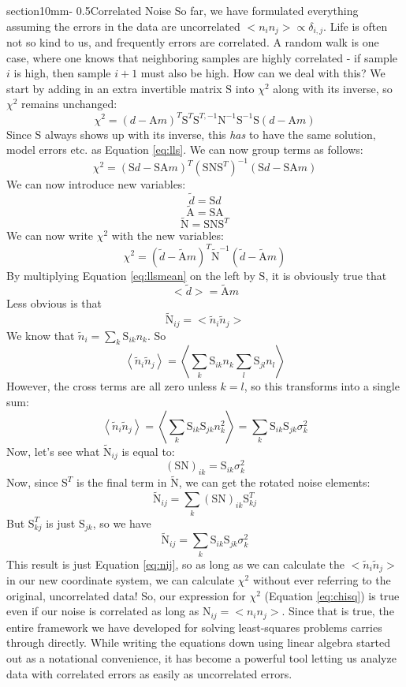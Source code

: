 \documentclass[letterpaper,11pt,preprint]{aastex}
\makeatletter
\renewcommand{\section}{\@startsection%
{section}{1}{0mm}{-\baselineskip}%
{0.5\baselineskip}{\normalfont\Large\bfseries}}%
\makeatother
\begin{document}
{\section{Correlated Noise}
So far, we have formulated everything assuming the errors in the data
are uncorrelated $<n_i n_j> \propto \delta_{i,j}$.  Life is often not
so kind to us, and frequently errors are correlated.  A random walk is
one case, where one knows that neighboring samples are highly correlated
- if sample $i$ is high, then sample $i+1$ must also be high.  How can
we deal with this?  We start by adding in an extra invertible matrix $\mathrm{S}$ into
$\chi^2$ along with its inverse, so $\chi^2$ remains unchanged:
$$\chi^2 = (d-\mathrm{A}m)^T \mathrm{S}^T \mathrm{S}^{T,-1}
\mathrm{N}^{-1} \mathrm{S}^{-1} \mathrm{S} (d-\mathrm{A}m)$$
Since $\mathrm{S}$ always shows up with its inverse, this
{\textit{has}} to have the same solution, model errors etc. as Equation \ref{eq:lls}.  We
can now group terms as follows:
$$\chi^2 = \left (\mathrm{S}d-\mathrm{SA}m \right)^T \left
(\mathrm{SNS}^T \right )^{-1}  \left (\mathrm{S}d-\mathrm{SA}m \right)$$
We can now introduce new variables:
$$\tilde{d}=\mathrm{S}d$$
$$\tilde{\mathrm{A}}=\mathrm{SA}$$
$$\tilde{\mathrm{N}}=\mathrm{SNS}^T$$
We can now write $\chi^2$ with the new variables:
$$\chi^2=\left (\tilde{d}-\tilde{\mathrm{A}}m \right )^T
\tilde{\mathrm{N}}^{-1} \left (\tilde{d}-\tilde{\mathrm{A}}m \right )$$
By multiplying Equation \ref{eq:llsmean} on the left by $\mathrm{S}$,
it is obviously true that 
$$<\tilde{d}> = \tilde{\mathrm{A}}m$$
Less obvious is that
$$\tilde{\mathrm{N}}_{ij}=<\tilde{n}_i \tilde{n}_j>$$
We know that $\tilde{n}_i = \sum_k \mathrm{S}_{ik}n_k$. So
$$\left <\tilde{n}_i\tilde{n}_j \right > =  \left < \sum_k \mathrm{S}_{ik}n_k
\sum_l \mathrm{S}_{jl}n_l\right >$$
However, the cross terms are all zero unless $k=l$, so this transforms
into a single sum:
\begin{equation} \label{eq:nij}
\left <\tilde{n}_i\tilde{n}_j \right > = \left < \sum_k
\mathrm{S}_{ik}\mathrm{S}_{jk}n_k^2 \right > = \sum_k \mathrm{S}_{ik}
\mathrm{S}_{jk} \sigma_k^2\end{equation}
Now, let's see what $\tilde{\mathrm{N}}_{ij}$ is equal to:
$$(\mathrm{SN})_{ik} = \mathrm{S}_{ik} \sigma_k^2$$
Now, since $\mathrm{S}^T$ is the final term in
$\tilde{\mathrm{N}}$, we can get the rotated noise elements:
$$\tilde{\mathrm{N}}_{ij}=\sum_k(\mathrm{SN})_{ik} \mathrm{S}^T_{kj}$$
But $\mathrm{S}^T_{kj}$ is just $\mathrm{S}_{jk}$, so we have
$$\tilde{\mathrm{N}}_{ij}=\sum_k  \mathrm{S}_{ik}\mathrm{S}_{jk} \sigma_k^2$$
This result is just Equation \ref{eq:nij}, so as long as we can
calculate the $<\tilde{n}_i\tilde{n}_j>$ in our new coordinate system,
we can calculate $\chi^2$ without ever referring to the original,
uncorrelated data!  So, our expression for $\chi^2$ (Equation
\ref{eq:chisq}) is true even if our noise is correlated as long as
$\mathrm{N}_{ij} = <n_in_j>$.  Since that is true, the entire
framework we have developed for solving least-squares problems carries
through directly.  While writing the equations down using linear
algebra started out as a notational convenience, it has become a
powerful tool letting us analyze data with correlated errors as easily
as uncorrelated errors.

}
\end{document}
